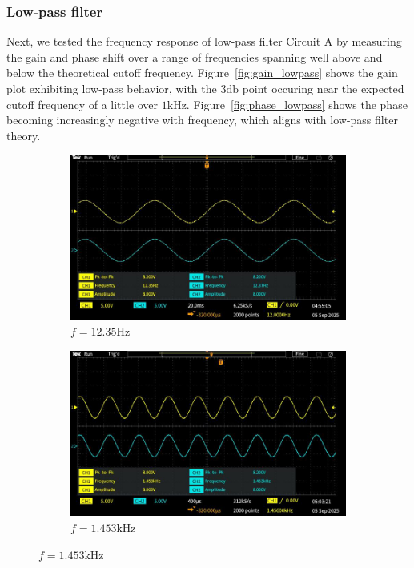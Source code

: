 \documentclass{article}
\begin{document}
\subsubsection{Low-pass filter}

Next, we tested the frequency response of low-pass filter Circuit A by measuring
the gain and phase shift over a range of frequencies spanning well above and 
below the theoretical cutoff frequency. Figure~\ref{fig:gain_lowpass} shows the gain
plot exhibiting low-pass behavior, with the $3\si{\decibel}$ point occuring near
the expected cutoff frequency of a little over $1\si{\kilo\hertz}$. 
Figure~\ref{fig:phase_lowpass} shows the phase becoming increasingly negative 
with frequency, which aligns with low-pass filter theory.

\begin{figure}[H]
    \centering
    \begin{subfigure}[b]{0.45\linewidth}
        \includegraphics[width=\linewidth]{2.1.ca.png}
        \caption{$f = 12.35\si{\hertz}$}
    \end{subfigure}
    \hfill
    \begin{subfigure}[b]{0.45\linewidth}
        \includegraphics[width=\linewidth]{2.1.cb.png}
        \caption{$f = 1.453\si{\kilo\hertz}$}
    \end{subfigure}


\end{figure}
\end{document}
